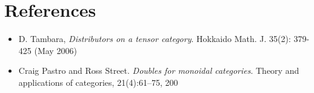 \documentclass[11pt]{amsart}
\begin{document}
\section{References}

\begin{itemize}
\item D. Tambara, \emph{Distributors on a tensor category}. Hokkaido Math. J. 35(2): 379-425 (May 2006)

\item Craig Pastro and Ross Street. \emph{Doubles for monoidal categories}. Theory and
applications of categories, 21(4):61–75, 200
\end{itemize}
\end{document}
